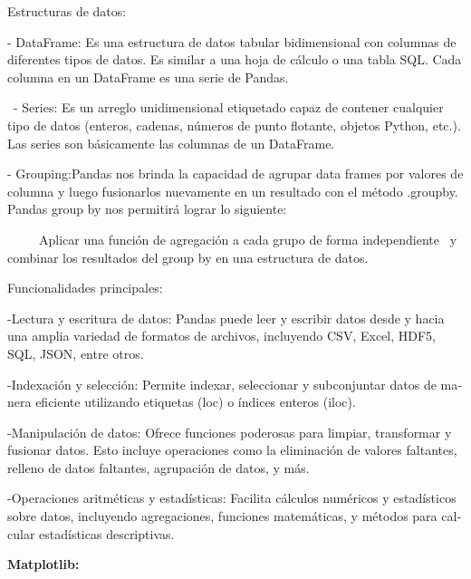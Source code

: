 \documentclass[letterpaper]{article}
\begin{document}
{
\foreignlanguage{spanish}{Estructuras de datos:}}

{
\foreignlanguage{spanish}{{}- DataFrame: Es una estructura de datos tabular bidimensional con columnas de diferentes
tipos de datos. Es similar a una hoja de cálculo o una tabla SQL. Cada columna en un DataFrame es una serie de
Pandas.}}

{
\foreignlanguage{spanish}{\ {}- Series: Es un arreglo unidimensional etiquetado capaz de contener cualquier tipo de
datos (enteros, cadenas, números de punto flotante, objetos Python, etc.). Las series son básicamente las columnas de
un DataFrame.}}

{
\foreignlanguage{spanish}{{}- Grouping:Pandas nos brinda la capacidad de agrupar data frames por valores de columna y
luego fusionarlos nuevamente en un resultado con el método .groupby. Pandas group by nos permitirá lograr lo
siguiente:}}

{
\foreignlanguage{spanish}{\ \ \ \ \ Aplicar una función de agregación a cada grupo de forma independiente \ y combinar
los resultados del group by en una estructura de datos.}}

{
\foreignlanguage{spanish}{Funcionalidades principales:}}

{
\foreignlanguage{spanish}{{}-Lectura y escritura de datos: Pandas puede leer y escribir datos desde y hacia una amplia
variedad de formatos de archivos, incluyendo CSV, Excel, HDF5, SQL, JSON, entre otros.}}

{
\foreignlanguage{spanish}{{}-Indexación y selección: Permite indexar, seleccionar y subconjuntar datos de manera
eficiente utilizando etiquetas (loc) o índices enteros (iloc).}}

{
\foreignlanguage{spanish}{{}-Manipulación de datos: Ofrece funciones poderosas para limpiar, transformar y fusionar
datos. Esto incluye operaciones como la eliminación de valores faltantes, relleno de datos faltantes, agrupación de
datos, y más.}}

{
\foreignlanguage{spanish}{{}-Operaciones aritméticas y estadísticas: Facilita cálculos numéricos y estadísticos sobre
datos, incluyendo agregaciones, funciones matemáticas, y métodos para calcular estadísticas descriptivas.}}


\bigskip

{
\foreignlanguage{spanish}{\textbf{Matplotlib: }}}
\end{document}
